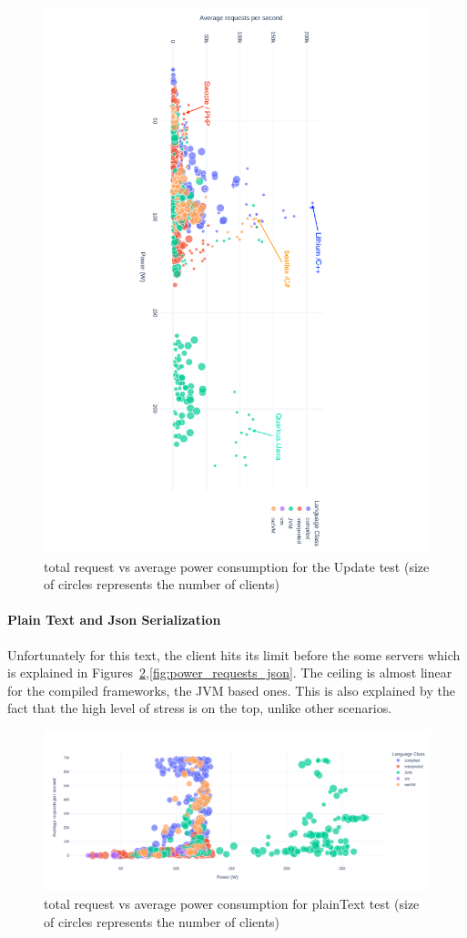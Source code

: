 \begin{figure}[hbt]
    \caption{total request vs average power consumption for the Update test (size of circles represents the number of clients) }
    \label{fig:power_requests_update}
    \includegraphics[height=\textwidth,width=\textheight,keepaspectratio,angle=9
        0]{imgs/power_requests_update}

\end{figure}

\paragraph{Plain Text and Json Serialization}
Unfortunately for this text, the client hits its limit before the some servers which is explained in Figures~\ref{fig:power_requests_plaintext},\ref{fig:power_requests_json}. The ceiling is almost linear for the compiled frameworks, the JVM based ones. This is also explained by the fact that the high level of stress is on the top, unlike other scenarios.


\begin{figure}[hbt]
    \centering
    \includegraphics[width=\textwidth,height=\textheight,keepaspectratio]{imgs/power_requests_plaintext}
    \caption{total request vs average power consumption for plainText test (size of circles represents the number of clients)}
    \label{fig:power_requests_plaintext}
\end{figure}

